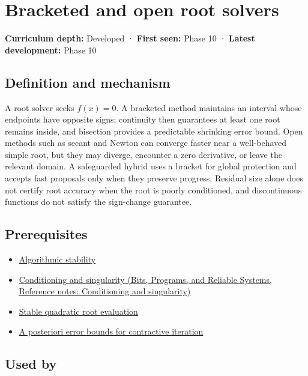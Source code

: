\hypertarget{appendix-f63eb850796d}{}\label{referencestart:appendix-f63eb850796d}
\section{Bracketed and open root solvers}\label{appendix-f63eb850796d-bracketed-and-open-root-solvers}

\textbf{Curriculum depth:} Developed · \textbf{First seen:} Phase 10 · \textbf{Latest development:} Phase 10

\subsection{Definition and mechanism}\label{appendix-f63eb850796d-definition-and-mechanism}

A root solver seeks \(f(x)=0\). A bracketed method maintains an interval whose endpoints have opposite signs; continuity then guarantees at least one root remains inside, and bisection provides a predictable shrinking error bound. Open methods such as secant and Newton can converge faster near a well-behaved simple root, but they may diverge, encounter a zero derivative, or leave the relevant domain. A safeguarded hybrid uses a bracket for global protection and accepts fast proposals only when they preserve progress. Residual size alone does not certify root accuracy when the root is poorly conditioned, and discontinuous functions do not satisfy the sign-change guarantee.

\subsection{Prerequisites}\label{appendix-f63eb850796d-prerequisites}

\begin{itemize}
\tightlist
\item
  \hyperref[appendix-aa2bf0d79639]{Algorithmic stability}
\item
  \href{../01-Bits-Programs-and-Reliable-Systems/main.pdf\#nameddest=appendix-8f6a01f284a7}{Conditioning and singularity (Bits, Programs, and Reliable Systems, Reference notes: Conditioning and singularity)}
\item
  \hyperref[appendix-b9afba7f63e5]{Stable quadratic root evaluation}
\item
  \hyperref[appendix-d83b0ad1be7f]{A posteriori error bounds for contractive iteration}
\end{itemize}

\subsection{Used by}\label{appendix-f63eb850796d-used-by}

